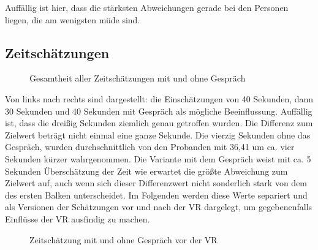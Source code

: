 \documentclass{Paper}
\begin{document}
Auffällig ist hier, dass die stärksten Abweichungen gerade bei den Personen liegen, die am wenigsten müde sind.

\subsection{Zeitschätzungen}
\begin{figure}[H]
\caption{Gesamtheit aller Zeitschätzungen mit und ohne Gespräch}
\label{ZeitGespr}
\end{figure}
\par
Von links nach rechts sind dargestellt: die Einschätzungen von 40 Sekunden, dann 30 Sekunden und 40 Sekunden mit Gespräch als mögliche Beeinflussung. Auffällig ist, dass die dreißig Sekunden ziemlich genau getroffen wurden. Die Differenz zum Zielwert beträgt nicht einmal eine ganze Sekunde. Die vierzig Sekunden ohne das Gespräch, wurden durchschnittlich von den Probanden mit 36,41 um ca. vier Sekunden kürzer wahrgenommen. Die Variante mit dem Gespräch weist mit ca. 5 Sekunden Überschätzung der Zeit wie erwartet die größte Abweichung zum Zielwert auf, auch wenn sich dieser Differenzwert nicht sonderlich stark von dem des ersten Balken unterscheidet. Im Folgenden werden diese Werte separiert und als Versionen der Schätzungen vor und nach der VR dargelegt, um gegebenenfalls Einflüsse der VR ausfindig zu machen.
\begin{figure}[H]
\caption{Zeitschätzung mit und ohne Gespräch vor der VR}
\label{ZeitVorVR}
\end{figure}
\end{document}
